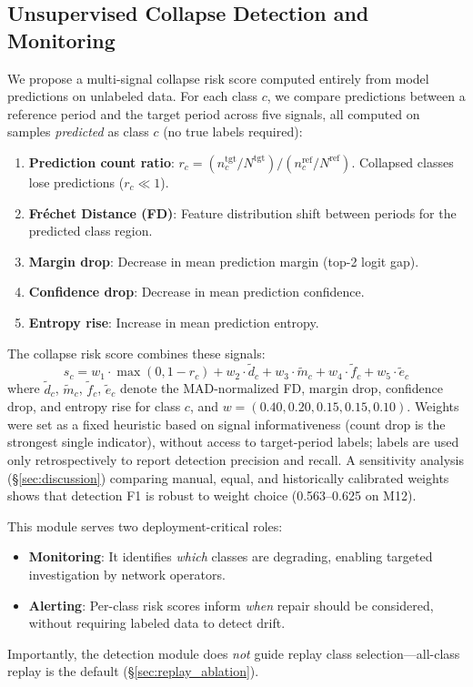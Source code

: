 \documentclass[journal]{IEEEtran}
\begin{document}
\subsection{Unsupervised Collapse Detection and Monitoring}
\label{sec:unsup_detect}

We propose a multi-signal collapse risk score computed entirely from model predictions on unlabeled data.
For each class $c$, we compare predictions between a reference period and the target period across five signals, all computed on samples \textit{predicted} as class $c$ (no true labels required):
\begin{enumerate}
  \item \textbf{Prediction count ratio}: $r_c = (n_c^{\text{tgt}}/N^{\text{tgt}}) / (n_c^{\text{ref}}/N^{\text{ref}})$. Collapsed classes lose predictions ($r_c \ll 1$).
  \item \textbf{Fr\'{e}chet Distance (FD)}: Feature distribution shift between periods for the predicted class region.
  \item \textbf{Margin drop}: Decrease in mean prediction margin (top-2 logit gap).
  \item \textbf{Confidence drop}: Decrease in mean prediction confidence.
  \item \textbf{Entropy rise}: Increase in mean prediction entropy.
\end{enumerate}

The collapse risk score combines these signals:
\begin{equation}
  s_c = w_1 \cdot \max(0, 1{-}r_c) + w_2 \cdot \tilde{d}_c + w_3 \cdot \tilde{m}_c + w_4 \cdot \tilde{f}_c + w_5 \cdot \tilde{e}_c
\end{equation}
where $\tilde{d}_c$, $\tilde{m}_c$, $\tilde{f}_c$, $\tilde{e}_c$ denote the MAD-normalized FD, margin drop, confidence drop, and entropy rise for class $c$, and $w = (0.40, 0.20, 0.15, 0.15, 0.10)$.
Weights were set as a fixed heuristic based on signal informativeness (count drop is the strongest single indicator), without access to target-period labels; labels are used only retrospectively to report detection precision and recall.
A sensitivity analysis (\S\ref{sec:discussion}) comparing manual, equal, and historically calibrated weights shows that detection F1 is robust to weight choice (0.563--0.625 on M12).

This module serves two deployment-critical roles:
\begin{itemize}
  \item \textbf{Monitoring}: It identifies \textit{which} classes are degrading, enabling targeted investigation by network operators.
  \item \textbf{Alerting}: Per-class risk scores inform \textit{when} repair should be considered, without requiring labeled data to detect drift.
\end{itemize}
Importantly, the detection module does \textit{not} guide replay class selection---all-class replay is the default (\S\ref{sec:replay_ablation}).
\end{document}
